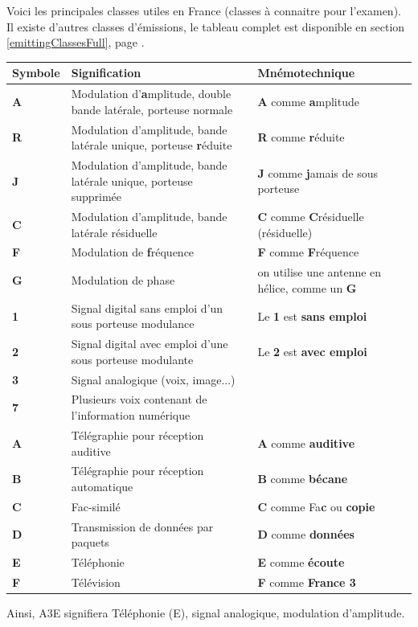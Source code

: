\documentclass[a4paper,12pt,oneside]{report} %
\begin{document}
		Voici les principales classes utiles en France (classes à connaitre pour l'examen). Il existe d'autres classes d'émissions, le tableau complet est disponible en section \ref{emittingClassesFull}, page \pageref{emittingClassesFull}.
		\begin{center}
	  	\begin{longtable}{|L{1.5cm}|L{7cm}|L{5cm}|}
	      \hline
	      Symbole & Signification & Mnémotechnique \tabularnewline
	    	\hline
			\hline
	      \textbf{A} & Modulation d'\textbf{a}mplitude, double bande latérale, porteuse normale & \textbf{A} comme \textbf{a}mplitude  \tabularnewline
	      \hline
			\textbf{R} & Modulation d'amplitude, bande latérale unique, porteuse \textbf{r}éduite & \textbf{R} comme \textbf{r}éduite  \tabularnewline
	      \hline
	\textbf{J} & Modulation d'amplitude,  bande latérale unique, porteuse supprimée & \textbf{J} comme \textbf{j}amais de sous porteuse  \tabularnewline
	      \hline
		\textbf{C} & Modulation d'amplitude, bande latérale résiduelle & \textbf{C} comme \textbf{C}résiduelle (résiduelle)  \tabularnewline
		\hline
		\textbf{F} & Modulation de \textbf{f}réquence & \textbf{F} comme \textbf{F}réquence  \tabularnewline
		\hline
		\textbf{G} & Modulation de phase & on utilise une antenne en hélice, comme un \textbf {G}  \tabularnewline
	     	\hline
			\hline
		\textbf{1} & Signal digital sans emploi d'un sous porteuse modulance & Le \textbf{1} est \textbf{sans emploi}  \tabularnewline
	      \hline
		\textbf{2} & Signal digital avec  emploi d'une sous porteuse modulante & Le \textbf{2} est \textbf{avec emploi}  \tabularnewline
		\hline
		\textbf{3} & Signal analogique (voix, image...) &  \tabularnewline
		\hline
		\textbf{7} & Plusieurs voix contenant de l'information numérique &  \tabularnewline
		\hline
		\hline
		\textbf{A} & Télégraphie pour réception auditive & \textbf{A} comme \textbf{auditive}  \tabularnewline
		\hline
		\textbf{B} & Télégraphie pour réception automatique & \textbf{B} comme \textbf{bécane}  \tabularnewline
		\hline
		\textbf{C} & Fac-similé & \textbf{C} comme Fa\textbf{c} ou \textbf{copie}  \tabularnewline
		\hline
		\textbf{D} & Transmission de données par paquets & \textbf{D} comme \textbf{données}  \tabularnewline
		\hline
		\textbf{E} & Téléphonie & \textbf{E} comme \textbf{écoute}  \tabularnewline
		\hline
		\textbf{F} & Télévision & \textbf{F} comme \textbf{France 3}  \tabularnewline
		\hline
		\end{longtable}
	\end{center}

Ainsi, A3E signifiera Téléphonie (E), signal analogique, modulation d'amplitude. \\
\end{document}
